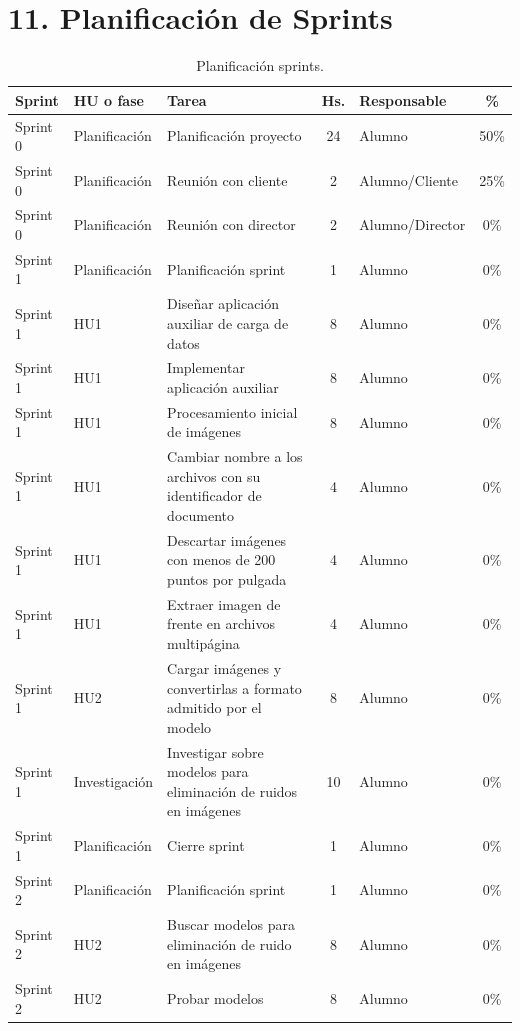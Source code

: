 \documentclass[
11pt, %
]{charter}
\begin{document}
\section{11. Planificación de Sprints}
\begin{table}[htpb]
\centering
\caption{Planificación sprints.}
\begin{tabularx}{\linewidth}{@{}|l|l|X|c|l|c|@{}}
\hline
\rowcolor[HTML]{C0C0C0}
Sprint	&	HU o fase	&	Tarea	&	Hs.	&	Responsable	&	\%	\\ \hline

Sprint 0	&	Planificación	&	Planificación proyecto	&	24	&	Alumno	&	50\%	\\ \hline
Sprint 0	&	Planificación	&	Reunión con cliente	&	2	&	Alumno/Cliente	&	25\%	\\ \hline
Sprint 0	&	Planificación	&	Reunión con director	&	2	&	Alumno/Director	&	0\%	\\ \hline
Sprint 1	&	Planificación	&	Planificación sprint	&	1	&	Alumno	&	0\%	\\ \hline
Sprint 1	&	HU1	&	Diseñar aplicación auxiliar de carga de datos	&	8	&	Alumno	&	0\%	\\ \hline
Sprint 1	&	HU1	&	Implementar aplicación auxiliar	&	8	&	Alumno	&	0\%	\\ \hline
Sprint 1	&	HU1	&	Procesamiento inicial de imágenes	&	8	&	Alumno	&	0\%	\\ \hline
Sprint 1	&	HU1	&	Cambiar nombre a los archivos con su identificador de documento	&	4	&	Alumno	&	0\%	\\ \hline
Sprint 1	&	HU1	&	Descartar imágenes con menos de 200 puntos por pulgada	&	4	&	Alumno	&	0\%	\\ \hline
Sprint 1	&	HU1	&	Extraer imagen de frente en archivos multipágina	&	4	&	Alumno	&	0\%	\\ \hline
Sprint 1	&	HU2	&	Cargar imágenes y convertirlas a formato admitido por el modelo	&	8	&	Alumno	&	0\%	\\ \hline
Sprint 1	&	Investigación	&	Investigar sobre modelos para eliminación de ruidos en imágenes	&	10	&	Alumno	&	0\%	\\ \hline
Sprint 1	&	Planificación	&	Cierre sprint	&	1	&	Alumno	&	0\%	\\ \hline
Sprint 2	&	Planificación	&	Planificación sprint	&	1	&	Alumno	&	0\%	\\ \hline
Sprint 2	&	HU2	&	Buscar modelos para eliminación de ruido en imágenes	&	8	&	Alumno	&	0\%	\\ \hline
Sprint 2	&	HU2	&	Probar modelos	&	8	&	Alumno	&	0\%	\\ \hline

\end{tabularx}
\end{table}
\end{document}
